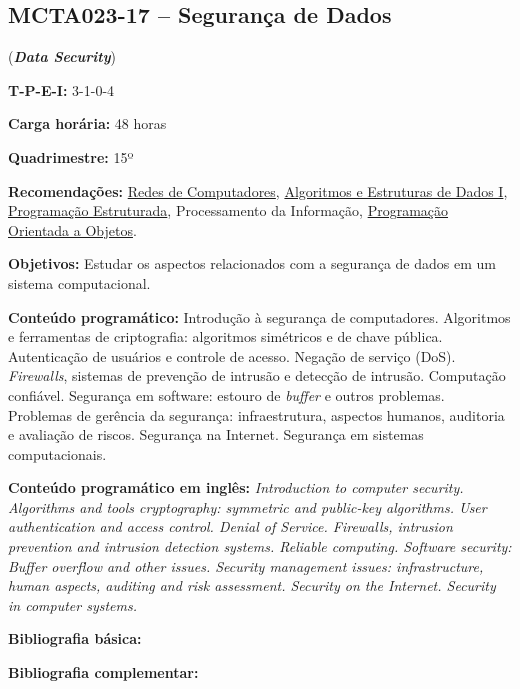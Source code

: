 \documentclass[12pt,a4paper]{article}
\begin{document}
\subsection*{MCTA023-17 -- Segurança de Dados}
\label{disc:seg}

(\textbf{\textit{Data Security}})

\begin{center}
    \begin{minipage}{0.85\textwidth}
    
        \textbf{T-P-E-I:} 3-1-0-4
        
        \textbf{Carga horária:} 48 horas
        
        \textbf{Quadrimestre:} 15º
        
        \textbf{Recomendações:} 
        \hyperref[disc:redes]{Redes de Computadores},
        \hyperref[disc:aedI]{Algoritmos e Estruturas de Dados I},
        \hyperref[disc:pe]{Programação Estruturada},
        Processamento da Informação,
        \hyperref[disc:poo]{Programação Orientada a Objetos}.
        
    \end{minipage}
\end{center}

\textbf{Objetivos:}
Estudar os aspectos relacionados com a segurança de dados em um sistema
computacional.

\textbf{Conteúdo programático:}
Introdução à segurança de computadores.
Algoritmos e ferramentas de criptografia: algoritmos simétricos e de chave pública.
Autenticação de usuários e controle de acesso.
Negação de serviço (DoS).
\textit{Firewalls}, sistemas de prevenção de intrusão e detecção de intrusão.
Computação confiável.
Segurança em software: estouro de \textit{buffer} e outros problemas.
Problemas de gerência da segurança: infraestrutura, aspectos humanos, auditoria
e avaliação de riscos. 
Segurança na Internet. Segurança em sistemas computacionais.

\textbf{Conteúdo programático em inglês:}
\textit{Introduction to computer security. 
Algorithms and tools cryptography: symmetric and public-key algorithms. 
User authentication and access control.
Denial of Service. 
Firewalls, intrusion prevention and intrusion detection systems. 
Reliable computing. 
Software security: Buffer overflow and other issues. 
Security management issues: infrastructure, human aspects, auditing and risk assessment. 
Security on the Internet. Security in computer systems.}

\newrefsection
\textbf{Bibliografia básica:}
\nocite{2013-goodrich-tamassia, 2008-stallings, 2007-nakamura-geus} 
\printbibliography

\newrefsection
\textbf{Bibliografia complementar:}
\nocite{2007-konheim, 1996-schneier, 2011-stamp, 2017-correia-sousa, 2005-cheswick-etal}
\printbibliography
\end{document}
